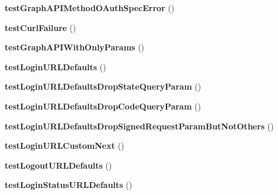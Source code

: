 \begin{DoxyCompactItemize}
\item 
\hypertarget{classPHPSDKTestCase_aac14894031cd58047eb66d7ef3088b0e}{{\bfseries test\-Graph\-A\-P\-I\-Method\-O\-Auth\-Spec\-Error} ()}\label{classPHPSDKTestCase_aac14894031cd58047eb66d7ef3088b0e}

\item 
\hypertarget{classPHPSDKTestCase_a57e88af850f269ac4d015766c91b96cf}{{\bfseries test\-Curl\-Failure} ()}\label{classPHPSDKTestCase_a57e88af850f269ac4d015766c91b96cf}

\item 
\hypertarget{classPHPSDKTestCase_a967d3d17ff03a6f31fabcda80b3a3d58}{{\bfseries test\-Graph\-A\-P\-I\-With\-Only\-Params} ()}\label{classPHPSDKTestCase_a967d3d17ff03a6f31fabcda80b3a3d58}

\item 
\hypertarget{classPHPSDKTestCase_ab2e1e4bd8ca881a3801460a66e9eecd1}{{\bfseries test\-Login\-U\-R\-L\-Defaults} ()}\label{classPHPSDKTestCase_ab2e1e4bd8ca881a3801460a66e9eecd1}

\item 
\hypertarget{classPHPSDKTestCase_abe3fd74a7a3277c18f51ae1af9ab6956}{{\bfseries test\-Login\-U\-R\-L\-Defaults\-Drop\-State\-Query\-Param} ()}\label{classPHPSDKTestCase_abe3fd74a7a3277c18f51ae1af9ab6956}

\item 
\hypertarget{classPHPSDKTestCase_a1115f379ac3bda2e5c5f34d9b0e796fa}{{\bfseries test\-Login\-U\-R\-L\-Defaults\-Drop\-Code\-Query\-Param} ()}\label{classPHPSDKTestCase_a1115f379ac3bda2e5c5f34d9b0e796fa}

\item 
\hypertarget{classPHPSDKTestCase_a01ec3144d841ade345b89745eb4595c2}{{\bfseries test\-Login\-U\-R\-L\-Defaults\-Drop\-Signed\-Request\-Param\-But\-Not\-Others} ()}\label{classPHPSDKTestCase_a01ec3144d841ade345b89745eb4595c2}

\item 
\hypertarget{classPHPSDKTestCase_a2a659864f5da55448750a921f389f1d1}{{\bfseries test\-Login\-U\-R\-L\-Custom\-Next} ()}\label{classPHPSDKTestCase_a2a659864f5da55448750a921f389f1d1}

\item 
\hypertarget{classPHPSDKTestCase_aafbe108f3e294c96c6cccbe0a83ad738}{{\bfseries test\-Logout\-U\-R\-L\-Defaults} ()}\label{classPHPSDKTestCase_aafbe108f3e294c96c6cccbe0a83ad738}

\item 
\hypertarget{classPHPSDKTestCase_a707f33e4c3e89326c90ca41cd5fc5007}{{\bfseries test\-Login\-Status\-U\-R\-L\-Defaults} ()}\label{classPHPSDKTestCase_a707f33e4c3e89326c90ca41cd5fc5007}


\end{DoxyCompactItemize}
